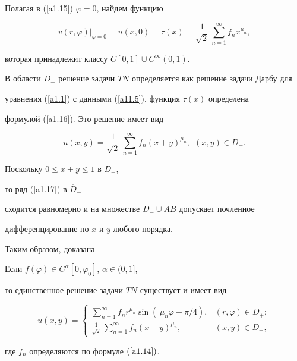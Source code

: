 Полагая в (\ref{a1.15}) $\varphi=0$, найдем функцию


\begin{equation}


v(r,\varphi)\big|_{\varphi=0}=u(x,0)=\tau(x)=\frac{1}{\sqrt 2}\,


\sum\limits_{n=1}^\infty f_nx^{\mu_n},\label{a1.16}


\end{equation}


которая принадлежит классу $C[0,1]\cup C^\infty(0,1)$.


В области $D_-$ решение задачи $TN$ определяется как решение задачи Дарбу для 


уравнения (\ref{a1.1}) с данными (\ref{a11.5}), функция $\tau(x)$ определена 


формулой (\ref{a1.16}). Это решение имеет вид


\begin{equation}


u(x,y)=\frac{1}{\sqrt 2}\,\sum_{n=1}^\infty f_n(x+y)^{\mu_n},


\ \ (x,y)\in D_-. \label{a1.17}


\end{equation}


Поскольку $0\le x+y\le 1$ в $\overline D_-$,


то ряд (\ref{a1.17}) в $\overline D_-$


сходится равномерно и на множестве $D_-\cup AB$ допускает почленное


дифференцирование по $x$ и $y$ любого порядка.





Таким образом, доказана





\begin{thm}


Если $f(\varphi)\in C^\alpha[0,\varphi_0]$, $\alpha\in(0,1]$, 


то единственное решение задачи $TN$ существует и имеет вид


$$


u(x,y)=


\begin{cases}


\sum\limits_{n=1}^\infty f_n r^{\mu_n}


\sin(\,\mu_n\varphi+\pi/4), & (r,\varphi)\in D_+;\\


\frac{1}{\sqrt2}\,\sum\limits_{n=1}^\infty 


f_n(x+y)^{\mu_n}, & (x,y)\in D_-,


\end{cases}


$$


где $f_n$ определяются по формуле $(\ref{a1.14})$.


\end{thm}








